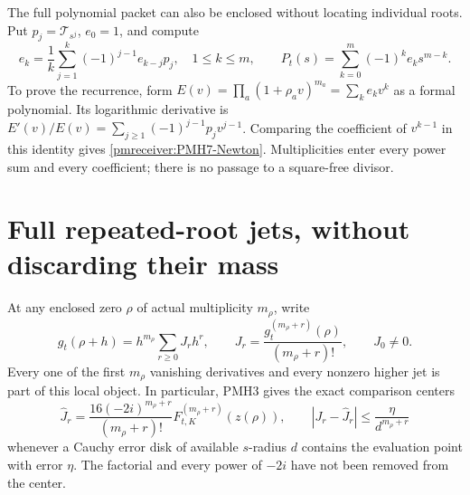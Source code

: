 \documentclass[11pt]{article}
\begin{document}
The full polynomial packet can also be enclosed without locating
individual roots. Put $p_j=\mathscr T_{s^j}$, $e_0=1$, and compute
\begin{equation}\label{pmreceiver:PMH7-Newton}
 e_k=\frac1k\sum_{j=1}^k(-1)^{j-1}e_{k-j}p_j,
 \quad 1\le k\le m,\qquad
 P_t(s)=\sum_{k=0}^m(-1)^ke_ks^{m-k}.
\end{equation}
To prove the recurrence, form
$E(v)=\prod_a(1+\rho_av)^{m_a}=\sum_ke_kv^k$ as a formal
polynomial. Its logarithmic derivative is
$E'(v)/E(v)=\sum_{j\ge1}(-1)^{j-1}p_jv^{j-1}$.
Comparing the coefficient of $v^{k-1}$ in this identity gives
\eqref{pmreceiver:PMH7-Newton}. Multiplicities enter every power sum and every
coefficient; there is no passage to a square-free divisor.

\section{Full repeated-root jets, without discarding their mass}

At any enclosed zero $\rho$ of actual multiplicity $m_\rho$, write
\begin{equation}\label{pmreceiver:PMH8-local}
 g_t(\rho+h)=h^{m_\rho}\sum_{r\ge0}J_rh^r,
 \qquad J_r=\frac{g_t^{(m_\rho+r)}(\rho)}{(m_\rho+r)!},
 \qquad J_0\ne0.
\end{equation}
Every one of the first $m_\rho$ vanishing derivatives and every
nonzero higher jet is part of this local object. In particular,
PMH3 gives the exact comparison centers
\begin{equation}\label{pmreceiver:PMH8-jets}
 \widehat J_r=
 \frac{16(-2i)^{m_\rho+r}}{(m_\rho+r)!}
 F_{t,K}^{(m_\rho+r)}(z(\rho)),\qquad
 |J_r-\widehat J_r|\le\frac{\eta}{d^{m_\rho+r}}
\end{equation}
whenever a Cauchy error disk of available $s$-radius $d$ contains
the evaluation point with error $\eta$. The factorial and every
power of $-2i$ have not been removed from the center.
\end{document}
